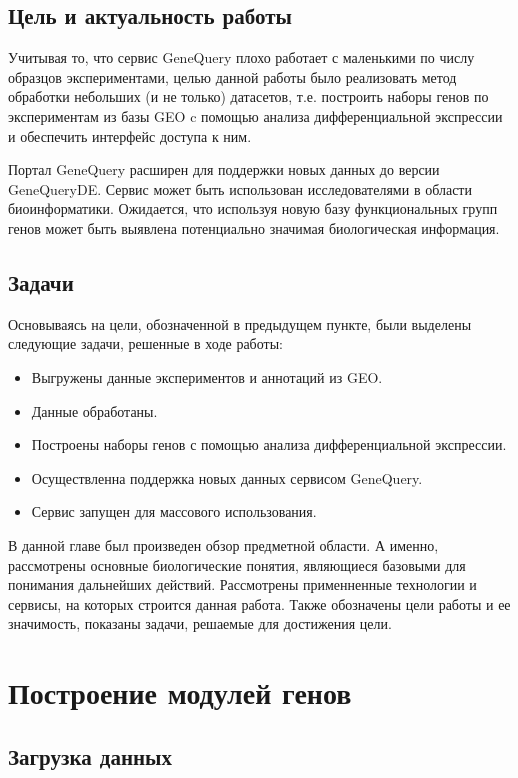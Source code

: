 \documentclass[times,specification,annotation]{itmo-student-thesis}
\begin{document}
\section{Цель и актуальность работы}

Учитывая то, что сервис GeneQuery плохо работает с маленькими по числу образцов экспериментами, целью данной работы было реализовать метод обработки небольших (и не только) датасетов, т.е. построить наборы генов по экспериментам из базы GEO c помощью анализа дифференциальной экспрессии и обеспечить интерфейс доступа к ним. 

Портал GeneQuery расширен для поддержки новых данных до версии GeneQueryDE. Сервис может быть использован исследователями в области биоинформатики. Ожидается, что используя новую базу функциональных групп генов может быть выявлена потенциально значимая биологическая информация. 

\section{Задачи}

Основываясь на цели, обозначенной в предыдущем пункте, были выделены следующие задачи, решенные в ходе работы:
\begin{itemize}
    \item Выгружены данные экспериментов и аннотаций из GEO.
    \item Данные обработаны.
    \item Построены наборы генов с помощью анализа дифференциальной экспрессии.
    \item Осуществленна поддержка новых данных сервисом GeneQuery.
    \item Сервис запущен для массового использования.
\end{itemize}

\chapterconclusion

В данной главе был произведен обзор предметной области. А именно, рассмотрены основные биологические понятия, являющиеся базовыми для понимания дальнейших действий. Рассмотрены применненные технологии и сервисы, на которых строится данная работа. Также обозначены цели работы и ее значимость, показаны задачи, решаемые для достижения цели. 
\finishrelatedwork

\chapter{Построение модулей генов}

\section{Загрузка данных}
\end{document}
